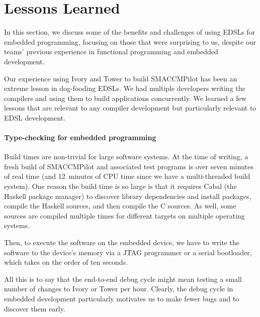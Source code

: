 \section{Lessons Learned}
\label{sec:thegood}

In this section, we discuss some of the benefits and challenges of
using EDSLs for embedded programming, focusing on those that were surprising to
us, despite our teams' previous experience in functional programming and
embedded development.

Our experience using Ivory and Tower to build SMACCMPilot has been an extreme
lesson in dog-fooding EDSLs.  We had multiple developers writing the compilers
and using them to build applications concurrently.  We learned a few lessons
that are relevant to any compiler development but particularly relevant to EDSL
development.

\paragraph{Type-checking for embedded programming}
Build times are non-trivial for large software systems.  At the time of writing,
a fresh build of SMACCMPilot and associated test programs is over seven minutes
of real time (and 12~minutes of CPU time since we have a multi-threaded build
system).  One reason the build time is so large is that it requires Cabal (the
Haskell package manager) to discover library dependencies and install packages,
compile the Haskell sources, and then compile the C sources.  As well, some
sources are compiled multiple times for different targets on
multiple operating systems.

Then, to execute the software on the embedded device, we have to write the
software to the device's memory via a JTAG programmer or a serial bootloader,
which takes on the order of ten seconds.

All this is to say that the end-to-end debug cycle might mean testing a small
number of changes to Ivory or Tower per hour.  Clearly, the debug cycle in
embedded development particularly motivates us to make fewer bugs and to
discover them early.



